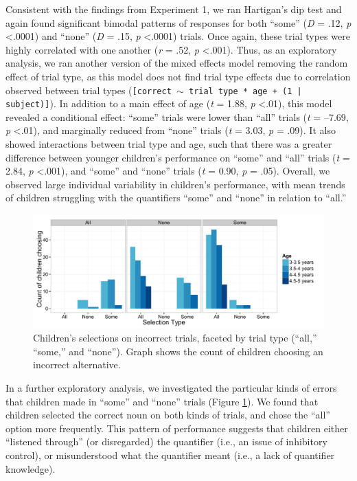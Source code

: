 \documentclass[man]{apa2}
\begin{document}
Consistent with the findings from Experiment 1, we  ran Hartigan's dip test and again found significant bimodal patterns of responses for both ``some'' (\textit{D} = .12, \textit{p} \textless  .0001) and ``none'' (\textit{D} = .15, \textit{p} \textless  .0001) trials. Once again, these trial types were highly correlated with one another (\textit{r} = .52, \textit{p} \textless  .001). Thus, as an exploratory analysis, we ran another version of the mixed effects model removing the random effect of trial type, as this model does not find trial type effects due to correlation observed between trial types (\small{\tt{[correct $\sim$ trial type * age + (1 | subject)]}}). In addition to a main effect of age (\textit{t} = 1.88, \textit{p} \textless  .01), this model revealed a conditional effect: ``some'' trials were lower than ``all'' trials (\textit{t} = --7.69, \textit{p} \textless  .01), and marginally reduced from ``none'' trials (\textit{t} = 3.03, \textit{p} = .09). It also showed interactions between trial type and age, such that there was a greater difference between younger children's performance on ``some'' and ``all'' trials (\textit{t} = 2.84, \textit{p} \textless  .001), and ``some'' and ``none'' trials (\textit{t} = 0.90, \textit{p} = .05). Overall, we observed large individual variability in children's performance, with mean trends of children struggling with the quantifiers ``some'' and ``none'' in relation to ``all.''

\begin{figure} 
 \begin{center} 
  \includegraphics[scale=.5]{figures/exp2_wrong.pdf} 
  \caption{\label{fig:exp2_wrong} Children's selections on incorrect trials, faceted by trial type (``all,'' ``some,'' and ``none''). Graph shows the count of children choosing an incorrect alternative.} 
 \end{center} 
\end{figure}

In a further exploratory analysis, we investigated the particular kinds of errors that children made in ``some'' and ``none'' trials (Figure \ref{fig:exp2_wrong}). We found that children selected the correct noun on both kinds of trials, and chose the ``all'' option more frequently. This pattern of performance suggests that children either ``listened through'' (or disregarded) the quantifier (i.e., an issue of inhibitory control), or misunderstood what the quantifier meant (i.e., a lack of quantifier knowledge). 
\end{document}
